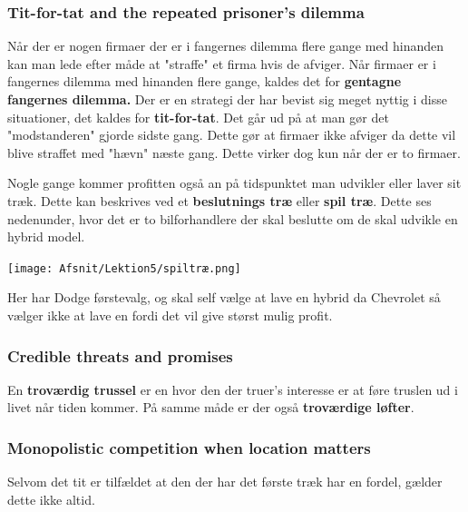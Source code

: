 \subsubsection{Tit-for-tat and the repeated prisoner's dilemma}
Når der er nogen firmaer der er i fangernes dilemma flere gange med hinanden kan man lede efter måde at "straffe" et firma hvis de afviger. Når firmaer er i fangernes dilemma med hinanden flere gange, kaldes det for \textbf{gentagne fangernes dilemma.} Der er en strategi der har bevist sig meget nyttig i disse situationer, det kaldes for \textbf{tit-for-tat}. Det går ud på at man gør det "modstanderen" gjorde sidste gang. Dette gør at firmaer ikke afviger da dette vil blive straffet med "hævn" næste gang. Dette virker dog kun når der er to firmaer. 

Nogle gange kommer profitten også an på tidspunktet man udvikler eller laver sit træk. Dette kan beskrives ved et \textbf{beslutnings træ} eller \textbf{spil træ}. Dette ses nedenunder, hvor det er to bilforhandlere der skal beslutte om de skal udvikle en hybrid model. 

\texttt{[image: Afsnit/Lektion5/spiltræ.png]}

Her har Dodge førstevalg, og skal self vælge at lave en hybrid da Chevrolet så vælger ikke at lave en fordi det vil give størst mulig profit. 

\subsubsection{Credible threats and promises}
En \textbf{troværdig trussel} er en hvor den der truer's interesse er at føre truslen ud i livet når tiden kommer. På samme måde er der også \textbf{troværdige løfter}.

\subsubsection{Monopolistic competition when location matters}
Selvom det tit er tilfældet at den der har det første træk har en fordel, gælder dette ikke altid. 

